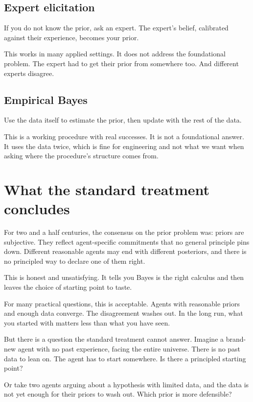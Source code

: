 \subsection*{Expert elicitation}

If you do not know the prior, ask an expert. The expert's belief, calibrated against their experience, becomes your prior.

This works in many applied settings. It does not address the foundational problem. The expert had to get their prior from somewhere too. And different experts disagree.

\subsection*{Empirical Bayes}

Use the data itself to estimate the prior, then update with the rest of the data.

This is a working procedure with real successes. It is not a foundational answer. It uses the data twice, which is fine for engineering and not what we want when asking where the procedure's structure comes from.

\section*{What the standard treatment concludes}

For two and a half centuries, the consensus on the prior problem was: priors are subjective. They reflect agent-specific commitments that no general principle pins down. Different reasonable agents may end with different posteriors, and there is no principled way to declare one of them right.

This is honest and unsatisfying. It tells you Bayes is the right calculus and then leaves the choice of starting point to taste.

For many practical questions, this is acceptable. Agents with reasonable priors and enough data converge. The disagreement washes out. In the long run, what you started with matters less than what you have seen.

But there is a question the standard treatment cannot answer. Imagine a brand-new agent with no past experience, facing the entire universe. There is no past data to lean on. The agent has to start somewhere. Is there a principled starting point?

Or take two agents arguing about a hypothesis with limited data, and the data is not yet enough for their priors to wash out. Which prior is more defensible?


